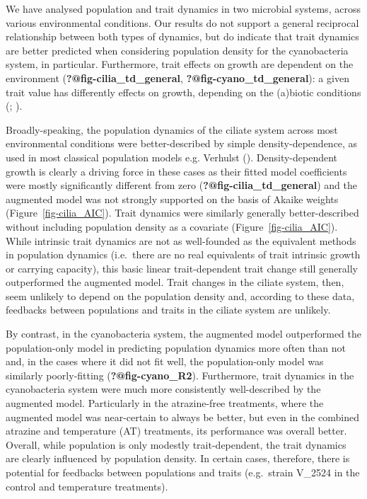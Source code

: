 \documentclass[
  letterpaper,
  DIV=11,
  numbers=noendperiod]{scrartcl}
\begin{document}
We have analysed population and trait dynamics in two microbial systems,
across various environmental conditions. Our results do not support a
general reciprocal relationship between both types of dynamics, but do
indicate that trait dynamics are better predicted when considering
population density for the cyanobacteria system, in particular.
Furthermore, trait effects on growth are dependent on the environment
(\textbf{?@fig-cilia\_td\_general}, \textbf{?@fig-cyano\_td\_general}):
a given trait value has differently effects on growth, depending on the
(a)biotic conditions (;
).

Broadly-speaking, the population dynamics of the ciliate system across
most environmental conditions were better-described by simple
density-dependence, as used in most classical population models e.g.
Verhulst (). Density-dependent growth
is clearly a driving force in these cases as their fitted model
coefficients were mostly significantly different from zero
(\textbf{?@fig-cilia\_td\_general}) and the augmented model was not
strongly supported on the basis of Akaike weights
(Figure~\ref{fig-cilia_AIC}). Trait dynamics were similarly generally
better-described without including population density as a covariate
(Figure~\ref{fig-cilia_AIC}). While intrinsic trait dynamics are not as
well-founded as the equivalent methods in population dynamics
(i.e.~there are no real equivalents of trait intrinsic growth or
carrying capacity), this basic linear trait-dependent trait change still
generally outperformed the augmented model. Trait changes in the ciliate
system, then, seem unlikely to depend on the population density and,
according to these data, feedbacks between populations and traits in the
ciliate system are unlikely.

By contrast, in the cyanobacteria system, the augmented model
outperformed the population-only model in predicting population dynamics
more often than not and, in the cases where it did not fit well, the
population-only model was similarly poorly-fitting
(\textbf{?@fig-cyano\_R2}). Furthermore, trait dynamics in the
cyanobacteria system were much more consistently well-described by the
augmented model. Particularly in the atrazine-free treatments, where the
augmented model was near-certain to always be better, but even in the
combined atrazine and temperature (AT) treatments, its performance was
overall better. Overall, while population is only modestly
trait-dependent, the trait dynamics are clearly influenced by population
density. In certain cases, therefore, there is potential for feedbacks
between populations and traits (e.g.~strain V\_2524 in the control and
temperature treatments).
\end{document}
